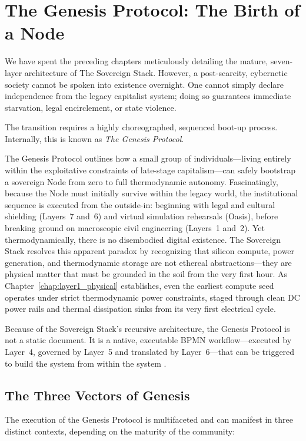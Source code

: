 \chapter{The Genesis Protocol: The Birth of a Node}

We have spent the preceding chapters meticulously detailing the mature, seven-layer architecture of The Sovereign Stack. However, a post-scarcity, cybernetic society cannot be spoken into existence overnight. One cannot simply declare independence from the legacy capitalist system; doing so guarantees immediate starvation, legal encirclement, or state violence. 

The transition requires a highly choreographed, sequenced boot-up process. Internally, this is known as \textit{The Genesis Protocol}. 

The Genesis Protocol outlines how a small group of individuals---living entirely within the exploitative constraints of late-stage capitalism---can safely bootstrap a sovereign Node from zero to full thermodynamic autonomy. Fascinatingly, because the Node must initially survive within the legacy world, the institutional sequence is executed from the outside-in: beginning with legal and cultural shielding (Layers~7 and~6) and virtual simulation rehearsals (Oasis), before breaking ground on macroscopic civil engineering (Layers~1 and~2). Yet thermodynamically, there is no disembodied digital existence. The Sovereign Stack resolves this apparent paradox by recognizing that silicon compute, power generation, and thermodynamic storage are not ethereal abstractions---they are physical matter that must be grounded in the soil from the very first hour. As Chapter~\ref{chap:layer1_physical} establishes, even the earliest compute seed operates under strict thermodynamic power constraints, staged through clean DC power rails and thermal dissipation sinks from its very first electrical cycle.

Because of the Sovereign Stack's recursive architecture, the Genesis Protocol is not a static document. It is a native, executable BPMN workflow---executed by Layer~4, governed by Layer~5 and translated by Layer~6---that can be triggered to build the system from within the system \parencite{beer1972,suarez2006}.

\section{The Three Vectors of Genesis}

The execution of the Genesis Protocol is multifaceted and can manifest in three distinct contexts, depending on the maturity of the community:

